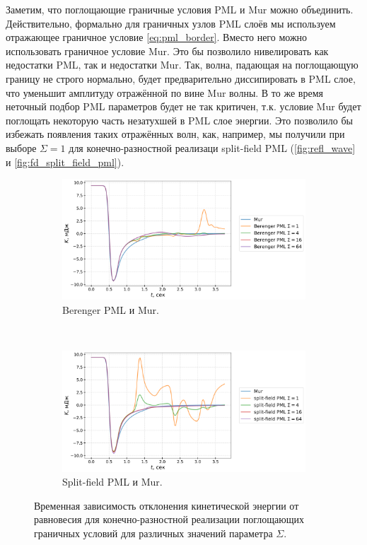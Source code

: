 Заметим, что поглощающие граничные условия PML и Mur можно объединить. Действительно, формально для граничных узлов PML слоёв мы используем отражающее граничное условие \eqref{eq:pml_border}. Вместо него можно использовать граничное условие Mur. Это бы позволило нивелировать как  недостатки PML, так и недостатки Mur. Так, волна, падающая на поглощающую границу не строго нормально, будет предварительно диссипировать в PML слое, что уменьшит амплитуду отражённой по вине Mur волны. В то же время неточный подбор PML параметров будет не так критичен, т.к. условие Mur будет поглощать некоторую часть незатухшей в PML слое энергии. Это позволило бы избежать появления таких отражённых волн, как, например, мы получили при выборе $\Sigma=1$ для конечно-разностной реализаци split-field PML (\autoref{fig:refl_wave} и \autoref{fig:fd_split_field_pml}).

\begin{figure}[h]
\centering
    \begin{subfigure}{1.0\textwidth}
        \centering
        \includegraphics[width=1.0\textwidth]{images/pml/fd_Berenger.png}
        \caption{Berenger PML и Mur.}
        \label{fig:fd_Berenger_pml}
    \end{subfigure}
\vspace{0.5cm}\\
    \begin{subfigure}{1.0\textwidth}
        \centering
        \includegraphics[width=1.0\textwidth]{images/pml/fd_split-field.png}
        \caption{Split-field PML и Mur.}
        \label{fig:fd_split_field_pml}
    \end{subfigure}
\caption{Временная зависимость отклонения кинетической энергии от равновесия для конечно-разностной реализации поглощающих граничных условий для различных значений параметра $\Sigma$.}
\label{fig:fd_pml}
\end{figure}

